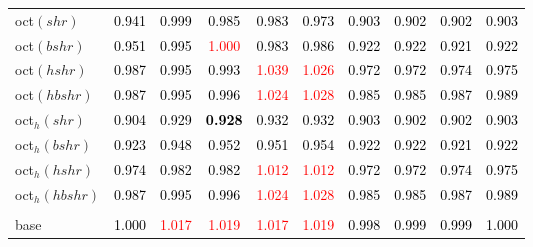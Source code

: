 \begin{tabular}[t]{>{\centering\arraybackslash}m{2.5cm}ccccccccc}
oct$(shr)$ & \textcolor{black}{0.941} & \textcolor{black}{0.999} & \textcolor{black}{0.985} & \textcolor{black}{0.983} & \textcolor{black}{0.973} & \textcolor{black}{0.903} & \textcolor{black}{0.902} & \textcolor{black}{0.902} & \textcolor{black}{0.903}\\
oct$(bshr)$ & \textcolor{black}{0.951} & \textcolor{black}{0.995} & \textcolor{red}{1.000} & \textcolor{black}{0.983} & \textcolor{black}{0.986} & \textcolor{black}{0.922} & \textcolor{black}{0.922} & \textcolor{black}{0.921} & \textcolor{black}{0.922}\\
oct$(hshr)$ & \textcolor{black}{0.987} & \textcolor{black}{0.995} & \textcolor{black}{0.993} & \textcolor{red}{1.039} & \textcolor{red}{1.026} & \textcolor{black}{0.972} & \textcolor{black}{0.972} & \textcolor{black}{0.974} & \textcolor{black}{0.975}\\
oct$(hbshr)$ & \textcolor{black}{0.987} & \textcolor{black}{0.995} & \textcolor{black}{0.996} & \textcolor{red}{1.024} & \textcolor{red}{1.028} & \textcolor{black}{0.985} & \textcolor{black}{0.985} & \textcolor{black}{0.987} & \textcolor{black}{0.989}\\
oct$_h(shr)$ & \textcolor{black}{0.904} & \textcolor{black}{0.929} & \textcolor{black}{\textbf{0.928}} & \textcolor{black}{0.932} & \textcolor{black}{0.932} & \textcolor{black}{0.903} & \textcolor{black}{0.902} & \textcolor{black}{0.902} & \textcolor{black}{0.903}\\
oct$_h(bshr)$ & \textcolor{black}{0.923} & \textcolor{black}{0.948} & \textcolor{black}{0.952} & \textcolor{black}{0.951} & \textcolor{black}{0.954} & \textcolor{black}{0.922} & \textcolor{black}{0.922} & \textcolor{black}{0.921} & \textcolor{black}{0.922}\\
oct$_h(hshr)$ & \textcolor{black}{0.974} & \textcolor{black}{0.982} & \textcolor{black}{0.982} & \textcolor{red}{1.012} & \textcolor{red}{1.012} & \textcolor{black}{0.972} & \textcolor{black}{0.972} & \textcolor{black}{0.974} & \textcolor{black}{0.975}\\
oct$_h(hbshr)$ & \textcolor{black}{0.987} & \textcolor{black}{0.995} & \textcolor{black}{0.996} & \textcolor{red}{1.024} & \textcolor{red}{1.028} & \textcolor{black}{0.985} & \textcolor{black}{0.985} & \textcolor{black}{0.987} & \textcolor{black}{0.989}\\
\addlinespace[0.3em]
\multicolumn{10}{c}{\textbf{$k = 1$}}\\
base & \textcolor{black}{1.000} & \textcolor{red}{1.017} & \textcolor{red}{1.019} & \textcolor{red}{1.017} & \textcolor{red}{1.019} & \textcolor{black}{0.998} & \textcolor{black}{0.999} & \textcolor{black}{0.999} & \textcolor{black}{1.000}\\

\end{tabular}
